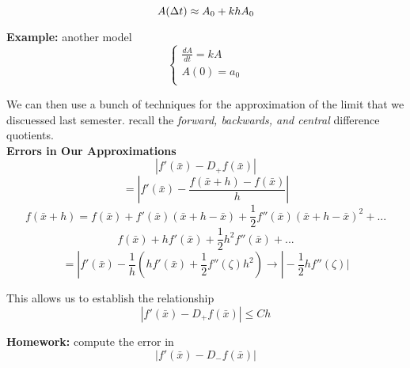 \documentclass[10pt, AMS Euler]{article}
\begin{document}
\[    A(\Delta t) \approx A_0 + k h A_0\\
\]

\textbf{Example:} another model
\[ 
    \begin{cases}
        \frac{dA}{dt} = kA\\
        A(0) = a_0\\
    \end{cases}
\]

We can then use a bunch of techniques for the approximation of the limit that we discuessed last semester. recall the \textit{forward, backwards, and central} difference quotients.\\


\textbf{Errors in Our Approximations}\\

\[|f'(\bar{x}) - D_+f(\bar{x})| \]
\[= |f'(\bar{x}) - \frac{f(\bar{x} + h) - f(\bar{x})}{h}|\]
\[f(\bar{x} + h) = f(\bar{x}) + f'(\bar{x}) (\bar{x} + h - \bar{x}) + \frac{1}{2}f''(\bar{x})(\bar{x} + h - \bar{x})^2 + ...\]
\[f(\bar{x}) + h f'(\bar{x}) + \frac{1}{2} h^2 f''(\bar{x}) + ... \]
\[= | f'(\bar{x}) - \frac{1}{h} (h f'(\bar{x}) + \frac{1}{2} f''(\zeta) h^2) \rightarrow |-\frac{1}{2} h f''(\zeta)| \]

This allows us to establish the relationship
\[|f'(\bar{x}) - D_+ f(\bar{x}) | \leq Ch \]


\textbf{Homework:} compute the error in
\[ |f'(\bar{x}) - D_- f(\bar{x})| \]

\noindent \underline{\hspace{3in}}\\
\end{document}
